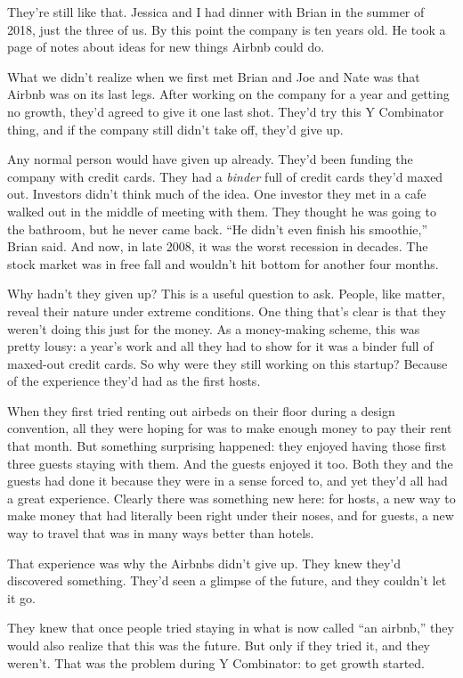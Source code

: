 \documentclass[12pt]{book}
\begin{document}
They're still like that. Jessica and I had dinner with Brian in the
summer of 2018, just the three of us. By this point the company is ten
years old. He took a page of notes about ideas for new things Airbnb
could do.

What we didn't realize when we first met Brian and Joe and Nate was that
Airbnb was on its last legs. After working on the company for a year and
getting no growth, they'd agreed to give it one last shot. They'd try
this Y Combinator thing, and if the company still didn't take off,
they'd give up.

Any normal person would have given up already. They'd been funding the
company with credit cards. They had a \emph{binder} full of credit cards
they'd maxed out. Investors didn't think much of the idea. One investor
they met in a cafe walked out in the middle of meeting with them. They
thought he was going to the bathroom, but he never came back. ``He
didn't even finish his smoothie,'' Brian said. And now, in late 2008, it
was the worst recession in decades. The stock market was in free fall
and wouldn't hit bottom for another four months.

Why hadn't they given up? This is a useful question to ask. People, like
matter, reveal their nature under extreme conditions. One thing that's
clear is that they weren't doing this just for the money. As a
money-making scheme, this was pretty lousy: a year's work and all they
had to show for it was a binder full of maxed-out credit cards. So why
were they still working on this startup? Because of the experience
they'd had as the first hosts.

When they first tried renting out airbeds on their floor during a design
convention, all they were hoping for was to make enough money to pay
their rent that month. But something surprising happened: they enjoyed
having those first three guests staying with them. And the guests
enjoyed it too. Both they and the guests had done it because they were
in a sense forced to, and yet they'd all had a great experience. Clearly
there was something new here: for hosts, a new way to make money that
had literally been right under their noses, and for guests, a new way to
travel that was in many ways better than hotels.

That experience was why the Airbnbs didn't give up. They knew they'd
discovered something. They'd seen a glimpse of the future, and they
couldn't let it go.

They knew that once people tried staying in what is now called ``an
airbnb,'' they would also realize that this was the future. But only if
they tried it, and they weren't. That was the problem during Y
Combinator: to get growth started.
\end{document}

